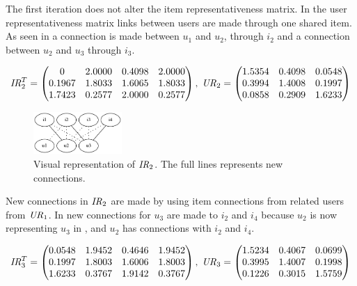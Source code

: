 \FloatBarrier

The first iteration does not alter the item representativeness matrix. In the user representativeness matrix links between users are made through one shared item.  As seen in  a connection is made between $u_1$ and $u_2$, through $i_2$ and a connection between $u_2$ and $u_3$ through $i_3$.

\[
    \mathit{IR}^T_2 = \begin{pmatrix}
             0 &  2.0000 &  0.4098 &  2.0000 \\
        0.1967 &  1.8033 &  1.6065 &  1.8033 \\
        1.7423 &  0.2577 &  2.0000 &  0.2577
    \end{pmatrix},
\;
    \mathit{UR}_2 = \begin{pmatrix}
        1.5354 &  0.4098 &  0.0548 \\
        0.3994 &  1.4008 &  0.1997 \\
        0.0858 &  0.2909 &  1.6233
    \end{pmatrix}
\]

\FloatBarrier

\begin{figure}[h!]
    \centering
    \includegraphics[width=0.3\textwidth]{fig/example_run/item_user_ir2.png}
    \caption{Visual representation of $\mathit{IR}_2$. The full lines represents new connections.}
    \label{fig:link:ir2}
\end{figure}

\FloatBarrier

New connections in $\mathit{IR}_2$ are made by using item connections from related users from $\mathit{UR}_1$. In  new connections for $u_3$ are made to $i_2$ and $i_4$ because $u_2$ is now representing $u_3$ in , and $u_2$ has connections with $i_2$ and $i_4$.

\[
    \mathit{IR}^T_3 = \begin{pmatrix}
        0.0548 &  1.9452 &  0.4646 &  1.9452 \\
        0.1997 &  1.8003 &  1.6006 &  1.8003 \\
        1.6233 &  0.3767 &  1.9142 &  0.3767
    \end{pmatrix},
\;
    \mathit{UR}_3 = \begin{pmatrix}
        1.5234 &  0.4067 &  0.0699 \\
        0.3995 &  1.4007 &  0.1998 \\
        0.1226 &  0.3015 &  1.5759
    \end{pmatrix}
\]

